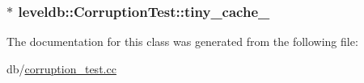\hypertarget{classleveldb_1_1_corruption_test_afc8ff2f272ee3da2756acc21c37750d5}{
\subsubsection[{tiny\-\_\-cache\-\_\-}]{$\ast$ leveldb\-::\-Corruption\-Test\-::tiny\-\_\-cache\-\_\-}}\label{classleveldb_1_1_corruption_test_afc8ff2f272ee3da2756acc21c37750d5}


The documentation for this class was generated from the following file\-:\begin{DoxyCompactItemize}
\item 
db/\hyperlink{corruption__test_8cc}{corruption\-\_\-test.\-cc}\end{DoxyCompactItemize}
